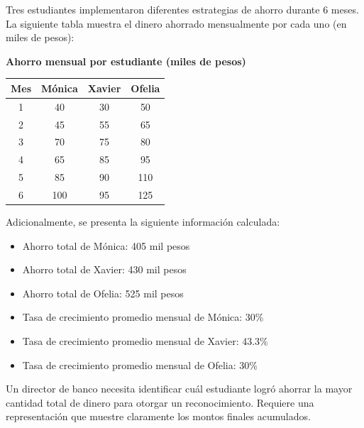 \documentclass[12pt,a4paper]{article}
\newenvironment{question}{}{}
\begin{document}



\begin{question}

Tres estudiantes implementaron diferentes estrategias de ahorro durante 6 meses. La siguiente tabla muestra el dinero ahorrado mensualmente por cada uno (en miles de pesos):

\par\vspace{0.5cm}

\begin{center}
\textbf{Ahorro mensual por estudiante (miles de pesos)}
\par\vspace{0.3cm}
\begin{tabular}{|c|c|c|c|}
\hline
\textbf{Mes} & \textbf{Mónica} & \textbf{Xavier} & \textbf{Ofelia} \\
\hline
1 & 40 & 30 & 50 \\
\hline
2 & 45 & 55 & 65 \\
\hline
3 & 70 & 75 & 80 \\
\hline
4 & 65 & 85 & 95 \\
\hline
5 & 85 & 90 & 110 \\
\hline
6 & 100 & 95 & 125 \\
\hline
\end{tabular}
\end{center}

\par\vspace{0.5cm}

Adicionalmente, se presenta la siguiente información calculada:

\begin{itemize}
\item Ahorro total de Mónica: 405 mil pesos
\item Ahorro total de Xavier: 430 mil pesos
\item Ahorro total de Ofelia: 525 mil pesos
\item Tasa de crecimiento promedio mensual de Mónica: 30\%
\item Tasa de crecimiento promedio mensual de Xavier: 43.3\%
\item Tasa de crecimiento promedio mensual de Ofelia: 30\%
\end{itemize}

\par\vspace{0.5cm}

Un director de banco necesita identificar cuál estudiante logró ahorrar la mayor cantidad total de dinero para otorgar un reconocimiento. Requiere una representación que muestre claramente los montos finales acumulados.


\end{question}
\end{document}
